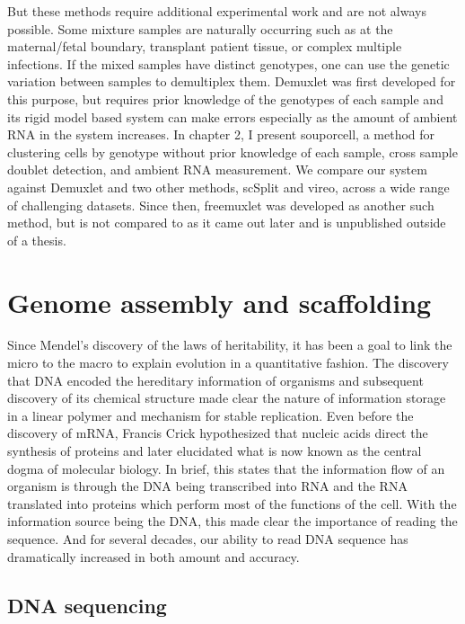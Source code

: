 \par{
But these methods require additional experimental work and are not always possible. Some mixture samples are naturally occurring such as at the maternal/fetal boundary, transplant patient tissue, or complex multiple infections. If the mixed samples have distinct genotypes, one can use the genetic variation between samples to demultiplex them. Demuxlet was first developed for this purpose, but requires prior knowledge of the genotypes of each sample and its rigid model based system can make errors especially as the amount of ambient RNA in the system increases\cite{muxseq}\cite{demuxlet}. In chapter 2, I present souporcell, a method for clustering cells by genotype without prior knowledge of each sample, cross sample doublet detection, and ambient RNA measurement. We compare our system against Demuxlet and two other methods, scSplit and vireo\cite{scsplit}\cite{vireo}, across a wide range of challenging datasets. Since then, freemuxlet was developed as another such method, but is not compared to as it came out later and is unpublished outside of a thesis\cite{freemuxlet}.
}

\section{Genome assembly and scaffolding}
\par{
Since Mendel's discovery of the laws of heritability\cite{Mendel}, it has been a goal to link the micro to the macro to explain evolution in a quantitative fashion\cite{evolutionmicro}. The discovery that DNA encoded the hereditary information of organisms\cite{Avery} and subsequent discovery of its chemical structure\cite{watsoncrick} made clear the nature of information storage in a linear polymer and mechanism for stable replication. Even before the discovery of mRNA\cite{mRNA1}\cite{mRNA2}, Francis Crick hypothesized that nucleic acids direct the synthesis of proteins\cite{proteinsynthesis} and later elucidated what is now known as the central dogma of molecular biology\cite{centraldogma1}. In brief, this states that the information flow of an organism is through the DNA being transcribed into RNA and the RNA translated into proteins which perform most of the functions of the cell. With the information source being the DNA, this made clear the importance of reading the sequence. And for several decades, our ability to read DNA sequence has dramatically increased in both amount and accuracy.
}

\subsection{DNA sequencing}

